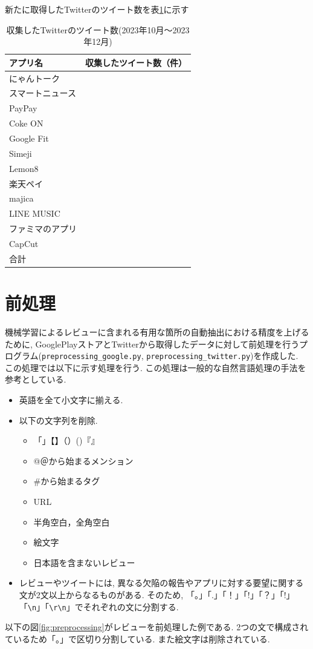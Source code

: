 新たに取得したTwitterのツイート数を表\ref{tb:rawtweetnum2023}に示す

\begin{table}[htbp]
  \caption{収集したTwitterのツイート数(2023年10月〜2023年12月)}
  \label{tb:rawtweetnum2023}
  \begin{center}
  \begin{tabular}{l|l}
    \hline
    アプリ名&収集したツイート数（件）\\\hline\hline
    にゃんトーク&\\\hline
    スマートニュース&\\\hline
    PayPay&\\\hline
    Coke ON&\\\hline
    Google Fit&\\\hline
    Simeji&\\\hline
    Lemon8&\\\hline
    楽天ペイ&\\\hline
    majica&\\\hline
    LINE MUSIC&\\\hline
    ファミマのアプリ&\\\hline
    CapCut&\\\hline\hline
    合計&
  \end{tabular}\end{center}
\end{table}


\section{前処理}
機械学習によるレビューに含まれる有用な箇所の自動抽出における精度を上げるために, GooglePlayストアとTwitterから取得したデータに対して前処理を行うプログラム(\verb|preprocessing_google.py|, \verb|preprocessing_twitter.py|)を作成した. この処理では以下に示す処理を行う. この処理は一般的な自然言語処理の手法を参考としている. 
\begin{itemize}
  \item 英語を全て小文字に揃える. 
  \item 以下の文字列を削除. 
    \begin{itemize}
      \item 「」【】（）()『』
      \item @＠から始まるメンション
      \item \#から始まるタグ
      \item URL
      \item 半角空白，全角空白
      \item 絵文字
      \item 日本語を含まないレビュー
    \end{itemize}
  \item レビューやツイートには, 異なる欠陥の報告やアプリに対する要望に関する文が2文以上からなるものがある. そのため, 「。」「.」「！」「!」「？」「!」「\verb|\n|」「\verb|\r\n|」でそれぞれの文に分割する. 
\end{itemize}
以下の図\ref{fig:preprocessing}がレビューを前処理した例である. 2つの文で構成されているため「。」で区切り分割している. また絵文字は削除されている. 

